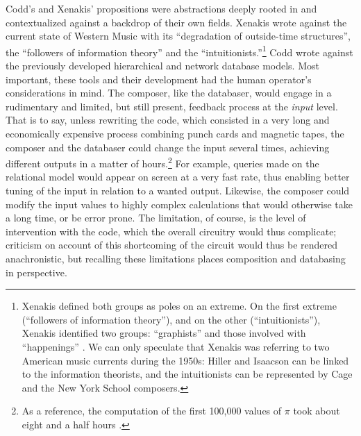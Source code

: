 Codd's and Xenakis' propositions were abstractions deeply rooted in and contextualized against a backdrop of their own fields. Xenakis wrote against the current state of Western Music with its ``degradation of outside-time structures'', the ``followers of information theory'' and the ``intuitionists.''\footnote{Xenakis defined both groups as poles on an extreme. On the first extreme (``followers of information theory''), and on the other (``intuitionists''), Xenakis identified two groups: ``graphists'' and those involved with ``happenings'' \parencite[180]{Xen92:For}. We can only speculate that Xenakis was referring to two American music currents during the 1950s: Hiller and Isaacson can be linked to the information theorists, and the intuitionists can be represented by Cage and the New York School composers.} Codd wrote against the previously developed hierarchical and network database models. Most important, these tools and their development had the human operator's considerations in mind. The composer, like the databaser, would engage in a rudimentary and limited, but still present, feedback process at the \textit{input} level. That is to say, unless rewriting the code, which consisted in a very long and economically expensive process combining punch cards and magnetic tapes, the composer and the databaser could change the input several times, achieving different outputs in a matter of hours.\footnote{As a reference, the computation of the first 100,000 values of $\pi$ took about eight and a half hours \parencite{picalc}.} For example, queries made on the relational model would appear on screen at a very fast rate, thus enabling better tuning of the input in relation to a wanted output. Likewise, the composer could modify the input values to highly complex calculations that would otherwise take a long time, or be error prone. The limitation, of course, is the level of intervention with the code, which the overall circuitry would thus complicate; criticism on account of this shortcoming of the circuit would thus be rendered anachronistic, but recalling these limitations places composition and databasing in perspective.

